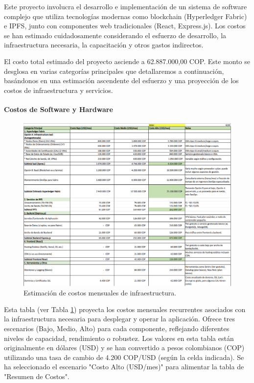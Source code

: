 \documentclass[
    letterpaper, 
    man,   
    spanish,
    12pt,
    donotrepeattitle,
    floatsintext,
    hidelinks %
]{apa7}
\begin{document}
Este proyecto involucra el desarrollo e implementación de un sistema de software complejo que utiliza tecnologías modernas como blockchain (Hyperledger Fabric) e IPFS, junto con componentes web tradicionales (React, Express.js). Los costos se han estimado cuidadosamente considerando el esfuerzo de desarrollo, la infraestructura necesaria, la capacitación y otros gastos indirectos. 

El costo total estimado del proyecto asciende a 62.887.000,00 COP. Este monto se desglosa en varias categorías principales que detallaremos a continuación, basándonos en una estimación ascendente del esfuerzo y una proyección de los costos de infraestructura y servicios. 

\paragraph{Costos de Software y Hardware}

\begin{figure}[htbp]
    \centering
    \includegraphics[width=\textwidth]{Images/costos2.png}
    \caption{Estimación de costos mensuales de infraestructura.}
    \label{fig:costos2}
\end{figure}

Esta tabla (ver Tabla \ref{fig:costos2}) proyecta los costos mensuales recurrentes asociados con la infraestructura necesaria para desplegar y operar la aplicación. Ofrece tres escenarios (Bajo, Medio, Alto) para cada componente, reflejando diferentes niveles de capacidad, rendimiento o robustez. Los valores en esta tabla están originalmente en dólares (USD) y se han convertido a pesos colombianos (COP) utilizando una tasa de cambio de 4.200 COP/USD (según la celda indicada). Se ha seleccionado el escenario "Costo Alto (USD/mes)" para alimentar la tabla de "Resumen de Costos". 
\end{document}
